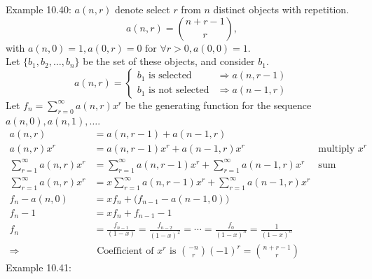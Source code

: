 \documentclass[a4paper]{article}
\begin{document}
Example 10.40: $a(n,r)$ denote select $r$ from $n$ distinct objects with repetition.
\begin{equation*}
a(n,r)=\binom{n+r-1}{r},
\end{equation*}
with $a(n,0)=1,a(0,r)=0\text{ for }\forall{r>0},a(0,0)=1$.\\
Let $\{b_{1},b_{2},\ldots,b_{n}\}$ be the set of these objects, and consider $b_1$.
\begin{equation*}
a(n,r)=
\begin{cases}
b_1\text{ is selected}&\Rightarrow a(n,r-1)\\
b_1\text{ is not selected}&\Rightarrow a(n-1,r)
\end{cases}
\end{equation*}
Let $f_n=\sum_{r=0}^{\infty}{a(n,r)x^r}$ be the generating function for the sequence $a(n,0),a(n,1),\ldots$.
\begin{align*}
    a(n,r)&=a(n,r-1)+ a(n-1,r)\\
    a(n,r)x^r&=a(n,r-1)x^r+ a(n-1,r)x^r&\text{multiply } x^r\\
    \sum_{r=1}^{\infty}{a(n,r)x^r}&=\sum_{r=1}^{\infty}{a(n,r-1)x^r}+ \sum_{r=1}^{\infty}{a(n-1,r)x^r}&\text{sum}\\
    \sum_{r=1}^{\infty}{a(n,r)x^r}&=x\sum_{r=1}^{\infty}{a(n,r-1)x^{r}}+ \sum_{r=1}^{\infty}{a(n-1,r)x^r}\\
    f_n-a(n,0)&=xf_n+\big(f_{n-1}-a(n-1,0)\big)\\
    f_n-1&=xf_n+f_{n-1}-1\\
    f_n&=\frac{f_{n-1}}{(1-x)}=\frac{f_{n-2}}{(1-x)^2}=\cdots=\frac{f_0}{(1-x)^n}=\frac{1}{(1-x)^n}\\
    \Rightarrow &\text{ Coefficient of }x^r\text{ is }\binom{-n}{r}(-1)^r=\binom{n+r-1}{r}
\end{align*}
Example 10.41: 
\end{document}
